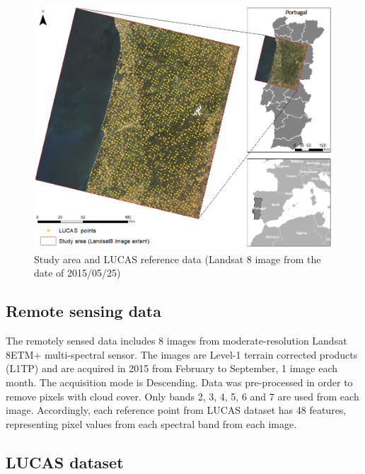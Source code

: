 \documentclass[remotesensing,article,submit,moreauthors,pdftex]{Definitions/mdpi}
\begin{document}
\begin{figure}[H]
	\centering
	\includegraphics[width=1\linewidth]{../analysis/study_area}
	\caption{Study area and LUCAS reference data (Landsat 8 image from the date 
	of 2015/05/25)}
	\label{fig:studyarea}
\end{figure}

\subsection{Remote sensing data}

The remotely sensed data includes 8 images from moderate-resolution Landsat 
8ETM+ multi-spectral sensor. The images are Level-1 terrain corrected products 
(L1TP) and are acquired in 2015 from February to September, 1 image each month. 
The acquisition mode is Descending.  Data was pre-processed in order to remove 
pixels with cloud cover. Only bands 2, 3, 4, 5, 6 and 7 are used from each 
image. Accordingly, each reference point from LUCAS dataset has 48 features,
representing pixel values from each spectral band from each image.

\subsection{LUCAS dataset}
\end{document}
